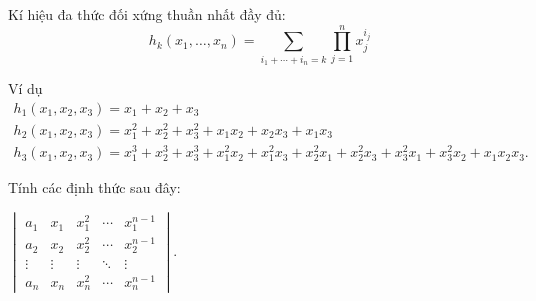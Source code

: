 \documentclass[class=nhvh-linear-algebra,crop=false]{standalone}
\begin{document}
\par Kí hiệu đa thức đối xứng thuần nhất đầy đủ:
\[
	h_{k}(x_{1}, \ldots, x_{n}) = \sum_{i_{1}+\cdots+i_{n}=k}\prod^{n}_{j=1}x^{i_{j}}_{j}
\]

\par Ví dụ
\begin{gather*}
	h_{1}(x_{1}, x_{2}, x_{3}) = x_{1} + x_{2} + x_{3} \\
	h_{2}(x_{1}, x_{2}, x_{3}) = x_{1}^{2} + x_{2}^{2} + x_{3}^{2} + x_{1}x_{2} + x_{2}x_{3} + x_{1}x_{3} \\
	h_{3}(x_{1}, x_{2}, x_{3}) = x_{1}^{3} + x_{2}^{3} + x_{3}^{3} + x_{1}^{2}x_{2} + x_{1}^{2}x_{3} + x_{2}^{2}x_{1} + x_{2}^{2}x_{3} + x_{3}^{2}x_{1} + x_{3}^{2}x_{2} + x_{1}x_{2}x_{3}.
\end{gather*}

\par Tính các định thức sau đây:

\begin{exercise}
	$\begin{vmatrix}
			a_{1}  & x_{1}  & x_{1}^{2} & \cdots & x_{1}^{n-1} \\
			a_{2}  & x_{2}  & x_{2}^{2} & \cdots & x_{2}^{n-1} \\
			\vdots & \vdots & \vdots    & \ddots & \vdots      \\
			a_{n}  & x_{n}  & x_{n}^{2} & \cdots & x_{n}^{n-1}
		\end{vmatrix}$.
\end{exercise}
\end{document}
